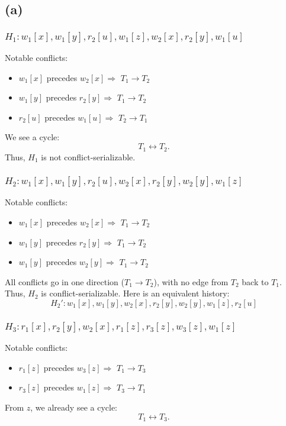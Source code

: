 \documentclass{article}
\begin{document}
\subsection*{(a)}
\subsubsection*{$H_1: w_1[x],w_1[y],r_2[u],w_1[z],w_2[x],r_2[y],w_1[u]$}

Notable conflicts:
\begin{itemize}
  \item $w_1[x]$ precedes $w_2[x]\Rightarrow$ $T_1 \to T_2$
  \item $w_1[y]$ precedes $r_2[y]\Rightarrow$ $T_1 \to T_2$
  \item $r_2[u]$ precedes $w_1[u]\Rightarrow$ $T_2 \to T_1$
\end{itemize}
We see a cycle:
$$
  \boxed{T_1 \leftrightarrow T_2.}
$$
Thus, $H_1$ is not conflict-serializable.

\subsubsection*{$H_2: w_1[x],w_1[y],r_2[u],w_2[x],r_2[y],w_2[y],w_1[z]$}

Notable conflicts:
\begin{itemize}
  \item $w_1[x]$ precedes $w_2[x]\Rightarrow$ $T_1 \to T_2$
  \item $w_1[y]$ precedes $r_2[y]\Rightarrow$ $T_1 \to T_2$
  \item $w_1[y]$ precedes $w_2[y]\Rightarrow$ $T_1 \to T_2$
\end{itemize}
All conflicts go in one direction ($T_1 \to T_2$), with no edge from $T_2$ back to $T_1$. Thus, $H_2$ is conflict-serializable. Here is an equivalent history:
$$
  \boxed{H_2': w_1[x],w_1[y],w_2[x],r_2[y],w_2[y],w_1[z],r_2[u]}
$$

\subsubsection*{$H_3: r_1[x],r_2[y],w_2[x],r_1[z],r_3[z],w_3[z],w_1[z]$}
Notable conflicts:
\begin{itemize}
  \item $r_1[z]$ precedes $w_3[z]\Rightarrow$ $T_1 \to T_3$
  \item $r_3[z]$ precedes $w_1[z]\Rightarrow$ $T_3 \to T_1$
\end{itemize}
From $z$, we already see a cycle:
$$
  \boxed{T_1 \leftrightarrow T_3.}
$$
\end{document}
